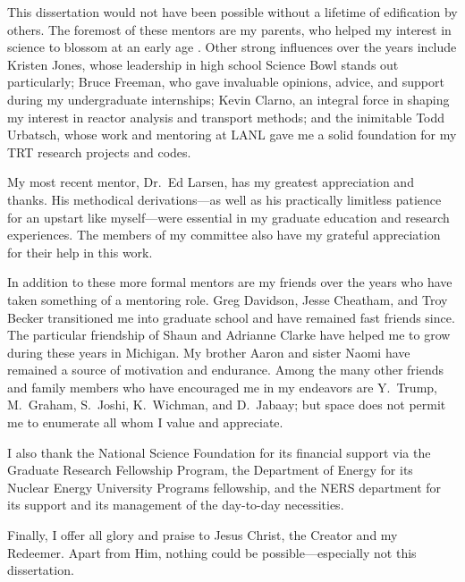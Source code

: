 \documentclass[twoside]{umthesis}
\begin{document}
\begin{acknowledgments}
  This dissertation would not have been possible without a lifetime of
  edification by others. The foremost of these mentors are my
  parents, who helped my
  interest in science to blossom at an early age \cite{Lew1989}.
  Other strong influences over the years include Kristen Jones, whose
  leadership in high school Science Bowl stands out particularly;
  Bruce Freeman, who gave invaluable opinions, advice, and support during my
  undergraduate internships; Kevin Clarno, an
  integral force in shaping my interest in reactor analysis and transport
  methods; and the inimitable Todd Urbatsch, whose work and mentoring at LANL
  gave me a solid foundation for my TRT research projects and codes.

  My most recent mentor, Dr.~Ed Larsen, has my greatest appreciation and thanks.
  His methodical derivations---as well as his practically limitless patience for
  an upstart like myself---were essential in my graduate education and
  research experiences. The members of my committee also have my grateful
  appreciation for their help in this work.

  In addition to these more formal mentors are my friends over the years who
  have taken something of a mentoring role. Greg Davidson, Jesse Cheatham, and
  Troy Becker transitioned me into graduate school and have remained fast
  friends since.
  The particular friendship of Shaun and Adrianne Clarke have
  helped me to grow during these years in Michigan. My brother Aaron and sister
  Naomi have remained a source of motivation and endurance.
  Among the many other friends and family members who have encouraged me in my
  endeavors are Y.~Trump, M.~Graham, S.~Joshi, K.~Wichman, and
  D.~Jabaay; but
  space does not permit me to enumerate all whom I value and appreciate.

  I also thank the National Science Foundation for its financial support via
  the Graduate Research Fellowship Program, the Department of Energy for its
  Nuclear Energy University Programs fellowship, and the NERS department for its
  support and its management of the day-to-day necessities.

  Finally, I offer all glory and praise to Jesus Christ, the Creator and my
  Redeemer. Apart from Him, nothing could be possible---especially not this
  dissertation.
\end{acknowledgments}

\end{document}
